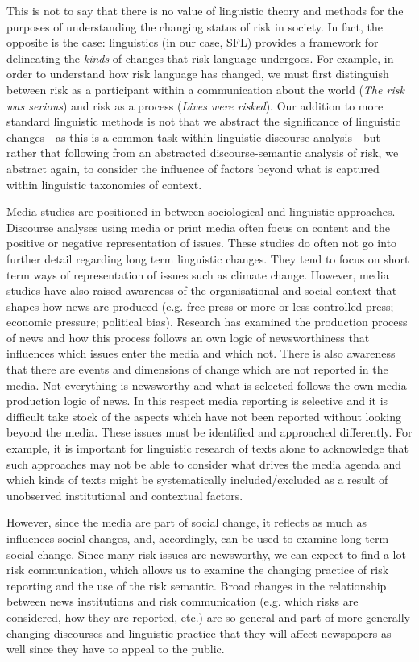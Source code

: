 This is not to say that there is no value of linguistic theory and methods for the purposes of understanding the changing status of risk in society. In fact, the opposite is the case: linguistics (in our case, SFL) provides a framework for delineating the \emph{kinds} of changes that risk language undergoes. For example, in order to understand how risk language has changed, we must first distinguish between risk as a participant within a communication about the world (\emph{The risk was serious}) and risk as a process (\emph{Lives were risked}). Our addition to more standard linguistic methods is not that we abstract the significance of linguistic changes---as this is a common task within linguistic discourse analysis---but rather that following from an abstracted discourse-semantic analysis of risk, we abstract again, to consider the influence of factors beyond what is captured within linguistic taxonomies of context.

Media studies are positioned in between sociological and linguistic approaches. Discourse analyses using media or print media often focus on content and the positive or negative representation of issues. These studies do often not go into further detail regarding long term linguistic changes. They tend to focus on short term ways of representation of issues such as climate change. However, media studies have also raised awareness of the organisational and social context that shapes how news are produced (e.g. free press or more or less controlled press; economic pressure; political bias). Research has examined the production process of news and how this process follows an own logic of newsworthiness that influences which issues enter the media and which not. There is also awareness that there are events and dimensions of change which are not reported in the media. Not everything is newsworthy and what is selected follows the own media production logic of news. In this respect media reporting is selective and it is difficult take stock of the aspects which have not been reported without looking beyond the media. These issues must be identified and approached differently. For example, it is important for linguistic research of texts alone to acknowledge that such approaches may not be able to consider what drives the media agenda and which kinds of texts might be systematically included\slash excluded as a result of unobserved institutional and contextual factors.


However, since the media are part of social change, it reflects as much as influences social changes, and, accordingly, can be used to examine long term social change. Since many risk issues are newsworthy, we can expect to find a lot risk communication, which allows us to examine the changing practice of risk reporting and the use of the risk semantic. Broad changes in the relationship between news institutions and risk communication (e.g. which risks are considered, how they are reported, etc.) are so general and part of more generally changing discourses and linguistic practice that they will affect newspapers as well since they have to appeal to the public.

